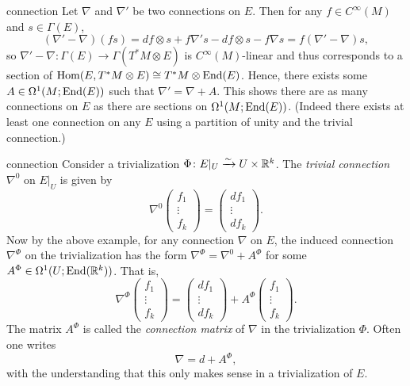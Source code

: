 \begin{example}{connection}
    Let $\nabla$ and $\nabla'$ be two connections on $E$. Then for any $f \in C^\infty(M)$ and $s \in \Gamma(E)$,
    \[ (\nabla' - \nabla) (fs) = df \otimes s + f \nabla' s - df \otimes s - f \nabla s = f(\nabla' - \nabla) s , \]
    so $\nabla' - \nabla \colon \Gamma(E) \to \Gamma(T^*M \otimes E)$ is $C^\infty(M)$-linear and thus corresponds to a section of $\operatorname{Hom}(E, T^*M \otimes E) \cong T^*M \otimes \textup{End}(E)$. Hence, there exists some $A \in \Omega^1(M; \textup{End}(E))$ such that $\nabla' = \nabla + A$. This shows there are as many connections on $E$ as there are sections on $\Omega^1(M; \textup{End}(E))$. (Indeed there exists at least one connection on any $E$ using a partition of unity and the trivial connection.)
\end{example}

\begin{example}{connection}
    Consider a trivialization $\Phi \colon E|_U \xrightarrow{\sim} U \times \mathbb{R}^k$. The \textit{trivial connection} $\nabla^0$ on $E|_U$ is given by
    \[ \nabla^0 \begin{pmatrix} f_1 \\ \vdots \\ f_k \end{pmatrix} = \begin{pmatrix} df_1 \\ \vdots \\ df_k \end{pmatrix} . \]
    Now by the above example, for any connection $\nabla$ on $E$, the induced connection $\nabla^\Phi$ on the trivialization has the form $\nabla^\Phi = \nabla^0 + A^\Phi$ for some $A^\Phi \in \Omega^1(U; \textup{End}(\mathbb{R}^k))$. That is,
    \[ \nabla^\Phi \begin{pmatrix} f_1 \\ \vdots \\ f_k \end{pmatrix} = \begin{pmatrix} df_1 \\ \vdots \\ df_k \end{pmatrix} + A^\Phi \begin{pmatrix} f_1 \\ \vdots \\ f_k \end{pmatrix} . \]
    The matrix $A^\Phi$ is called the \textit{connection matrix} of $\nabla$ in the trivialization $\Phi$. Often one writes \[ \nabla = d + A^\Phi , \]
    with the understanding that this only makes sense in a trivialization of $E$.
\end{example}

